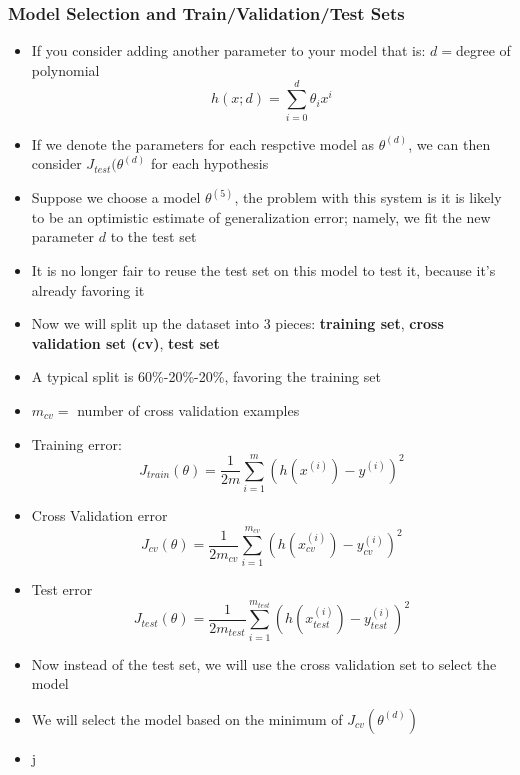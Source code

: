 \subsubsection{Model Selection and Train/Validation/Test Sets}
\begin{itemize}[--]
	\item If you consider adding another parameter to your model that is: $d=$degree of polynomial
		$$h(x;d)=\sum_{i=0}^{d}\theta_i x^{i}$$
	\item If we denote the parameters for each respctive model as $\theta^{(d)}$, we can then consider $J_{test}(\theta^{(d)}$ for each hypothesis
	\item Suppose we choose a model $\theta^{(5)}$, the problem with this system is it is likely to be an optimistic estimate of generalization error; namely, we fit the new parameter $d$ to the test set
	\item It is no longer fair to reuse the test set on this model to test it, because it's already favoring it
	\item Now we will split up the dataset into 3 pieces: \textbf{training set}, \textbf{cross validation set (cv)}, \textbf{test set}
	\item A typical split is 60\%-20\%-20\%, favoring the training set
	\item $m_{cv}=$ number of cross validation examples
	\item Training error:
		$$J_{train}(\theta) = \frac{1}{2m}\sum_{i=1}^{m} (h(x^{(i)}) - y^{(i)})^2$$
	\item Cross Validation error
		$$J_{cv}(\theta) = \frac{1}{2m_{cv}}\sum_{i=1}^{m_{cv}} (h(x^{(i)}_{cv}) - y^{(i)}_{cv})^2$$
	\item Test error
		$$J_{test}(\theta) = \frac{1}{2m_{test}}\sum_{i=1}^{m_{test}} (h(x^{(i)}_{test}) - y^{(i)}_{test})^2$$
	\item Now instead of the test set, we will use the cross validation set to select the model
	\item We will select the model based on the minimum of $J_{cv}(\theta^{(d)})$
	\item j

\end{itemize}


